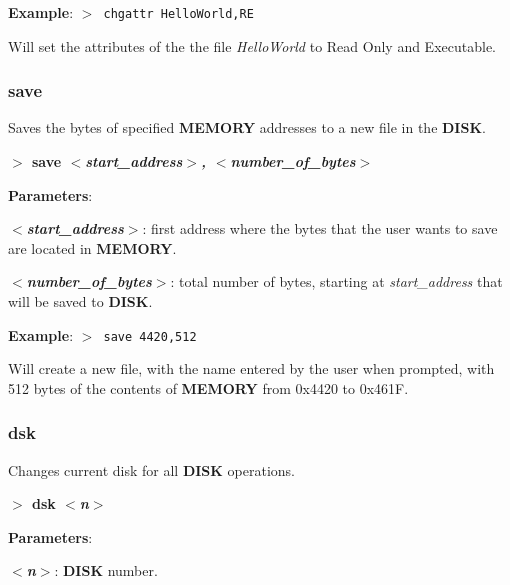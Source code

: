         \textbf{Example}: \texttt{$>$ chgattr HelloWorld,RE}

        Will set the attributes of the the file \textit{HelloWorld} to Read Only
        and Executable.

        \subsubsection{{save}}
        \label{cmd:save}

        Saves the bytes of specified \textbf{MEMORY} addresses to a new file in
        the \textbf{DISK}.

        \hspace{1.9cm}\textbf{$>$ save \textit{$<$start\_address$>$,
        $<$number\_of\_bytes$>$}}

        \textbf{Parameters}:

        \hspace{1cm}\textbf{\textit{$<$start\_address$>$}}: first address where
        the bytes that the user wants to save are located in \textbf{MEMORY}.

        \hspace{1cm}\textbf{\textit{$<$number\_of\_bytes$>$}}: total number of
        bytes, starting at \textit{start\_address} that will be saved to
        \textbf{DISK}.
        
        \textbf{Example}: \texttt{$>$ save 4420,512}

        Will create a new file, with the name entered by the user when prompted,
        with 512 bytes of the contents of \textbf{MEMORY} from 0x4420 to 0x461F.

        \subsubsection{{dsk}}
        \label{cmd:dsk}

        Changes current disk for all \textbf{DISK} operations.

        \hspace{1.9cm}\textbf{$>$ dsk \textit{$<$n$>$}}

        \textbf{Parameters}:

        \hspace{1cm}\textbf{\textit{$<$n$>$}}: \textbf{DISK} number.

